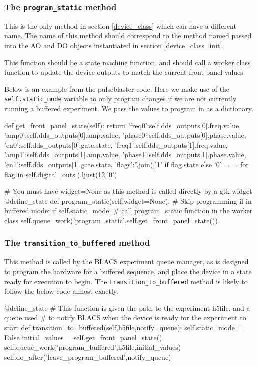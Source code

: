 \documentclass[12pt]{article}
\begin{document}
\subsubsection{The \texttt{program\_static} method} \label{device_class_program_static}
This is the only method in section \ref{device_class} which can have a different name. The name of this method should correspond to the method named passed into the AO and DO objects instantiated in section \ref{device_class_init}.

This function should be a state machine function, and should call a worker class function to update the device outputs to match the current front panel values.

Below is an example from the pulseblaster code. Here we make use of the \texttt{self.static\_mode} variable to only program changes if we are not currently running a buffered experiment. We pass the values to program in as a dictionary.

\begin{python}
    def get_front_panel_state(self):
        return {'freq0':self.dds_outputs[0].freq.value,
                'amp0':self.dds_outputs[0].amp.value,
                'phase0':self.dds_outputs[0].phase.value,
                'en0':self.dds_outputs[0].gate.state,
                'freq1':self.dds_outputs[1].freq.value,
                'amp1':self.dds_outputs[1].amp.value,
                'phase1':self.dds_outputs[1].phase.value,
                'en1':self.dds_outputs[1].gate.state,
                'flags':''.join(['1' if flag.state else '0' ...
                ... for flag in self.digital_outs]).ljust(12,'0')}
    
    # You must have widget=None as this method is called directly by a gtk widget
    @define_state
    def program_static(self,widget=None):
        # Skip programming if in buffered mode:
        if self.static_mode:
        	# call program_static function in the worker class
            self.queue_work('program_static',self.get_front_panel_state())
\end{python}

\subsubsection{The \texttt{transition\_to\_buffered} method}\label{device_class_transition_to_buffered}
This method is called by the BLACS experiment queue manager, as is designed to program the hardware for a buffered sequence, and place the device in a state ready for execution to begin. The \texttt{transition\_to\_buffered} method is likely to follow the below code almost exactly.
\begin{python}
@define_state
    # This function is given the path to the experiment h5file, and a queue used
    # to notify BLACS when the device is ready for the experiment to start
    def transition_to_buffered(self,h5file,notify_queue):
        self.static_mode = False 
        initial_values = self.get_front_panel_state()
        self.queue_work('program_buffered',h5file,initial_values)
        self.do_after('leave_program_buffered',notify_queue)
\end{python}
\end{document}
